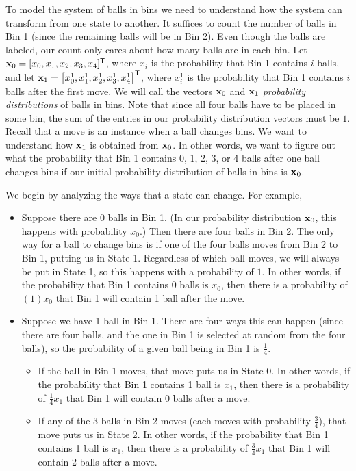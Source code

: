 \begin{pactivity} \label{act:Eherenfest_model} To model the system of balls in bins we need to understand how the system can transform from one state to another. It suffices to count the number of balls in Bin 1 (since the remaining balls will be in Bin 2). Even though the balls are labeled, our count only cares about how many balls are in each bin. Let $\mathbf{x}_0 = [x_0, x_1, x_2, x_3, x_4]^{\mathsf{T}}$, where $x_i$ is the probability that Bin 1 contains $i$ balls, and let $\mathbf{x}_1 = \left[ x_0^1, x_1^1, x_2^1, x_3^1, x_4^1 \right]^{\mathsf{T}}$, where $x_i^1$ is the probability that Bin 1 contains $i$ balls after the first move. We will call the vectors $\mathbf{x}_0$ and $\mathbf{x}_1$ \emph{probability distributions} of balls in bins. Note that since all four balls have to be placed in some bin, the sum of the entries in our probability distribution vectors must be $1$. Recall that a move is an instance when a ball changes bins. We want to understand how $\mathbf{x}_1$ is obtained from $\mathbf{x}_0$. In other words, we want to figure out what the probability that Bin 1 contains 0, 1, 2, 3, or 4 balls after one ball changes bins if our initial probability distribution of balls in bins is $\mathbf{x}_0$. 

We begin by analyzing the ways that a state can change. For example, 
\begin{itemize}
\item Suppose there are $0$ balls in Bin 1. (In our probability distribution $\mathbf{x}_0$, this happens with probability $x_0$.) Then there are four balls in Bin 2. The only way for a ball to change bins is if one of the four balls moves from Bin 2 to Bin 1, putting us in State 1. Regardless of which ball moves, we will always be put in State 1, so this happens with a probability of $1$. In other words, if the probability that Bin 1 contains $0$ balls is $x_0$, then there is a probability of $(1)x_0$ that Bin 1 will contain 1 ball after the move. 

\item Suppose we have 1 ball in Bin 1. There are four ways this can happen (since there are four balls, and the one in Bin 1 is selected at random from the four balls), so the probability of a given ball being in Bin 1 is $\frac{1}{4}$. 
	\begin{itemize}
	\item If the ball in Bin 1 moves, that move puts us in State $0$. In other words, if the probability that Bin 1 contains 1 ball is $x_1$, then there is a probability of $\frac{1}{4}x_1$ that Bin 1 will contain $0$ balls after a move.
	\item If any of the $3$ balls in Bin 2 moves (each moves with probability $\frac{3}{4}$), that move puts us in State 2. In other words, if the probability that Bin 1 contains 1 ball is $x_1$, then there is a probability of $\frac{3}{4}x_1$ that Bin 1 will contain $2$ balls after a move.
	\end{itemize}
\end{itemize}


\end{pactivity}
